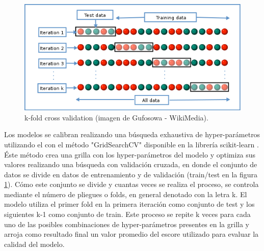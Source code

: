 \begin{figure}[h!]
  \begin{center}
    \includegraphics[height=2.in]{Figures/GridsearchCV.png}
    \caption{ k-fold cross validation (imagen de Gufosowa - WikiMedia).}
    \label{KCV}
  \end{center}
\end{figure}


Los modelos se calibran realizando una búsqueda exhaustiva de hyper-parámetros utilizando el 
con el método "GridSearchCV" disponible en la librería scikit-learn \cite{scikit}.
Éste método crea una grilla con los hyper-parámetros del modelo y optimiza sus valores realizando una búsqueda
 con validación cruzada, en donde el conjunto de datos se divide en datos de entrenamiento y de validación 
 (train/test en la figura \ref{KCV}).  Cómo este conjunto se divide y cuantas veces se realiza el proceso, se controla mediante el 
 número de pliegues o folds, en general denotado con la letra k.
 El modelo utiliza el primer fold en la primera iteración como conjunto de test y 
 los siguientes k-1 como conjunto de train. Este proceso se repite k veces para cada uno de las posibles 
 combinaciones de hyper-parámetros presentes en la grilla y arroja como resultado final un valor promedio 
 del escore utilizado para evaluar  la calidad del modelo. 

